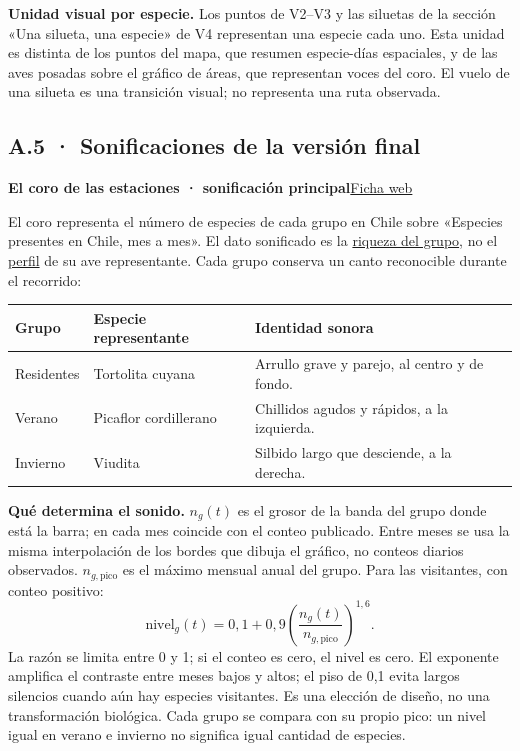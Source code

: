 \documentclass[11pt,a4paper]{article}
\newcommand{\Sitio}{https://canija2000.github.io/infovis_2026-2/}
\DeclareRobustCommand{\concepto}[2]{\hyperlink{concepto:#1}{\textcolor{acento}{#2}}}
\newcommand{\defconcepto}[3]{\par\needspace{6\baselineskip}\hypertarget{concepto:#1}{}\textbf{#2}\hfill\href{\Sitio metricas.html\##3}{\textcolor{acento}{\footnotesize Ficha web}}\par\nopagebreak}
\newcommand{\volverconceptos}{\par\medskip{\footnotesize\hyperlink{anexo:conceptos}{\textcolor{acento}{Volver al índice de conceptos}} · \hyperlink{texto:contexto}{\textcolor{acento}{Volver al contexto del proyecto}}}}
\begin{document}
\hypertarget{concepto:unidad-visual}{}\textbf{Unidad visual por especie.} Los puntos de V2--V3 y las siluetas de la sección «Una silueta, una especie» de V4 representan una especie cada uno. Esta unidad es distinta de los puntos del mapa, que resumen especie-días espaciales, y de las aves posadas sobre el gráfico de áreas, que representan voces del coro. El vuelo de una silueta es una transición visual; no representa una ruta observada.
\volverconceptos

\clearpage
\subsection*{A.5 · Sonificaciones de la versión final}

\defconcepto{coro-estaciones}{El coro de las estaciones · sonificación principal}{coro-estaciones}
El coro representa el número de especies de cada grupo en Chile sobre «Especies presentes en Chile, mes a mes». El dato sonificado es la \concepto{riqueza}{riqueza del grupo}, no el \concepto{perfil}{perfil} de su ave representante. Cada grupo conserva un canto reconocible durante el recorrido:

\begin{tabularx}{\linewidth}{@{}p{31mm}p{43mm}X@{}}
\toprule
Grupo & Especie representante & Identidad sonora\\
\midrule
Residentes & Tortolita cuyana & Arrullo grave y parejo, al centro y de fondo.\\
Verano & Picaflor cordillerano & Chillidos agudos y rápidos, a la izquierda.\\
Invierno & Viudita & Silbido largo que desciende, a la derecha.\\
\bottomrule
\end{tabularx}

\textbf{Qué determina el sonido.} $n_g(t)$ es el grosor de la banda del grupo donde está la barra; en cada mes coincide con el conteo publicado. Entre meses se usa la misma interpolación de los bordes que dibuja el gráfico, no conteos diarios observados. $n_{g,\text{pico}}$ es el máximo mensual anual del grupo. Para las visitantes, con conteo positivo:
\[
\text{nivel}_g(t)=0{,}1+0{,}9
\left(\frac{n_g(t)}{n_{g,\text{pico}}}\right)^{1{,}6}.
\]
La razón se limita entre 0 y 1; si el conteo es cero, el nivel es cero. El exponente amplifica el contraste entre meses bajos y altos; el piso de 0,1 evita largos silencios cuando aún hay especies visitantes. Es una elección de diseño, no una transformación biológica. Cada grupo se compara con su propio pico: un nivel igual en verano e invierno no significa igual cantidad de especies.
\end{document}
